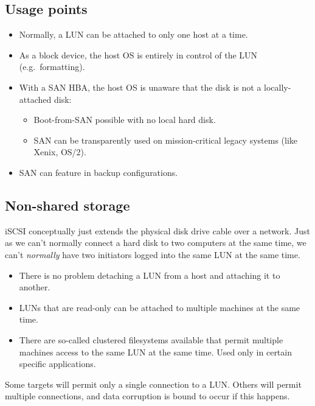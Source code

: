\subsection{Usage points}
\label{sec:usage-points}

\begin{itemize}
\item
  Normally, a LUN can be attached to only one host at a time.
\item
  As a block device, the host OS is entirely in control of the LUN
  (e.g.~formatting).
\item
  With a SAN HBA, the host OS is unaware that the disk is not a
  locally-attached disk:

  \begin{itemize}
  \item
    Boot-from-SAN possible with no local hard disk.
  \item
    SAN can be transparently used on mission-critical legacy systems
    (like Xenix, OS/2).
  \end{itemize}
\item
  SAN can feature in backup configurations.
\end{itemize}

\subsection{Non-shared storage}
\label{sec:non-shared-storage}

iSCSI conceptually just extends the physical disk drive cable over a
network. Just as we can't normally connect a hard disk to two computers
at the same time, we can't \emph{normally} have two initiators logged
into the same LUN at the same time.

\begin{itemize}
\item
  There is no problem detaching a LUN from a host and attaching it to
  another.
\item
  LUNs that are read-only can be attached to multiple machines at the
  same time.
\item
  There are so-called clustered filesystems available that permit
  multiple machines access to the same LUN at the same time. Used only
  in certain specific applications.
\end{itemize}

Some targets will permit only a single connection to a LUN. Others will
permit multiple connections, and data corruption is bound to occur if
this happens.

